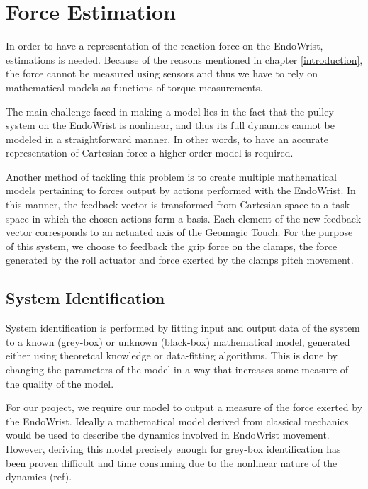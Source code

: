 
\chapter{Force Estimation}
In order to have a representation of the reaction force on the EndoWrist, estimations is needed.
Because of the reasons mentioned in chapter \ref{introduction}, the force cannot be measured using sensors and thus we have to rely on mathematical models as functions of torque measurements.

The main challenge faced in making a model lies in the fact that the pulley system on the EndoWrist is nonlinear, and thus its full dynamics cannot be modeled in a straightforward manner. 
In other words, to have an accurate representation of Cartesian force a higher order model is required.

Another method of tackling this problem is to create multiple mathematical models pertaining to forces output by actions performed with the EndoWrist.
In this manner, the feedback vector is transformed from Cartesian space to a task space in which the chosen actions form a basis.
Each element of the new feedback vector corresponds to an actuated axis of the Geomagic Touch.
For the purpose of this system, we choose to feedback the grip force on the clamps, the force generated by the roll actuator and force exerted by the clamps pitch movement.

\section{System Identification}
System identification is performed by fitting input and output data of the system to a known (grey-box) or unknown (black-box) mathematical model, generated either using theoretcal knowledge or data-fitting algorithms. 
This is done by changing the parameters of the model in a way that increases some measure of the quality of the model.

For our project, we require our model to output a measure of the force exerted by the EndoWrist.
Ideally a mathematical model derived from classical mechanics would be used to describe the dynamics involved in EndoWrist movement.
However, deriving this model precisely enough for grey-box identification has been proven difficult and time consuming due to the nonlinear nature of the dynamics (ref).

